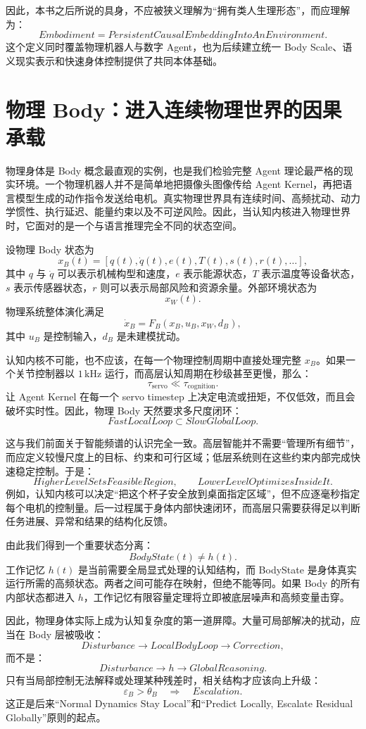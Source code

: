因此，本书之后所说的具身，不应被狭义理解为“拥有类人生理形态”，而应理解为：
\[
\boxed{
Embodiment
=
PersistentCausalEmbeddingIntoAnEnvironment.
}
\]
这个定义同时覆盖物理机器人与数字 Agent，也为后续建立统一 Body Scale、语义现实表示和快速身体控制提供了共同本体基础。

\section{物理 Body：进入连续物理世界的因果承载}

物理身体是 Body 概念最直观的实例，也是我们检验完整 Agent 理论最严格的现实环境。一个物理机器人并不是简单地把摄像头图像传给 Agent Kernel，再把语言模型生成的动作指令发送给电机。真实物理世界具有连续时间、高频扰动、动力学惯性、执行延迟、能量约束以及不可逆风险。因此，当认知内核进入物理世界时，它面对的是一个与语言推理完全不同的状态空间。

设物理 Body 状态为
\[
x_B(t)
=
[
q(t),
\dot q(t),
e(t),
T(t),
s(t),
r(t),
\ldots
],
\]
其中 $q$ 与 $\dot q$ 可以表示机械构型和速度，$e$ 表示能源状态，$T$ 表示温度等设备状态，$s$ 表示传感器状态，$r$ 则可以表示局部风险和资源余量。外部环境状态为
\[
x_W(t).
\]
物理系统整体演化满足
\[
\dot{x}_B
=
F_B
\left(
x_B,
u_B,
x_W,
d_B
\right),
\]
其中 $u_B$ 是控制输入，$d_B$ 是未建模扰动。

认知内核不可能，也不应该，在每一个物理控制周期中直接处理完整 $x_B$。如果一个关节控制器以 $1\,\mathrm{kHz}$ 运行，而高层认知周期在秒级甚至更慢，那么：
\[
\tau_{\mathrm{servo}}
\ll
\tau_{\mathrm{cognition}}.
\]
让 Agent Kernel 在每一个 servo timestep 上决定电流或扭矩，不仅低效，而且会破坏实时性。因此，物理 Body 天然要求多尺度闭环：
\[
\boxed{
FastLocalLoop
\subset
SlowGlobalLoop.
}
\]

这与我们前面关于智能频谱的认识完全一致。高层智能并不需要“管理所有细节”，而应定义较慢尺度上的目标、约束和可行区域；低层系统则在这些约束内部完成快速稳定控制。于是：
\[
\boxed{
HigherLevelSetsFeasibleRegion,
\qquad
LowerLevelOptimizesInsideIt.
}
\]
例如，认知内核可以决定“把这个杯子安全放到桌面指定区域”，但不应逐毫秒指定每个电机的控制量。后一过程属于身体内部快速闭环，而高层只需要获得足以判断任务进展、异常和结果的结构化反馈。

由此我们得到一个重要状态分离：
\[
\boxed{
BodyState(t)
\neq
h(t).
}
\]
工作记忆 $h(t)$ 是当前需要全局显式处理的认知结构，而 BodyState 是身体真实运行所需的高频状态。两者之间可能存在映射，但绝不能等同。如果 Body 的所有内部状态都进入 $h$，工作记忆有限容量定理将立即被底层噪声和高频变量击穿。

因此，物理身体实际上成为认知复杂度的第一道屏障。大量可局部解决的扰动，应当在 Body 层被吸收：
\[
Disturbance
\rightarrow
LocalBodyLoop
\rightarrow
Correction,
\]
而不是：
\[
Disturbance
\rightarrow
h
\rightarrow
GlobalReasoning.
\]
只有当局部控制无法解释或处理某种残差时，相关结构才应该向上升级：
\[
\varepsilon_B
>
\theta_B
\quad\Rightarrow\quad
Escalation.
\]
这正是后来“Normal Dynamics Stay Local”和“Predict Locally, Escalate Residual Globally”原则的起点。

